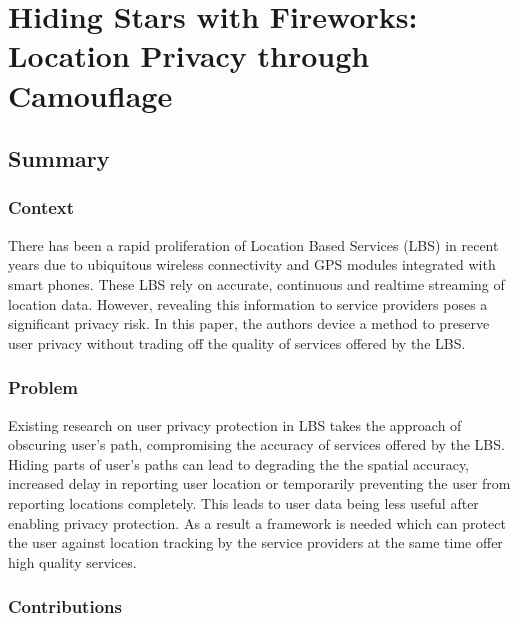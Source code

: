 \newpage
\section{Hiding Stars with Fireworks:
Location Privacy through Camouflage \cite{conf/europar/PetzoldBTU06}}\label{lect4}

\subsection{Summary} \label{lect4-sum}

\subsubsection{Context}

There has been a rapid proliferation of Location Based Services (LBS) in recent
years due to ubiquitous wireless connectivity and GPS modules integrated with 
smart phones. These LBS rely on accurate, continuous and realtime streaming of 
location data. However, revealing this information to service providers poses a 
significant privacy risk. In this paper, the authors device a method to preserve
user privacy without trading off the quality of services offered by the LBS. 

\subsubsection{Problem}

Existing research on user privacy protection in LBS takes the approach of 
obscuring user's path, compromising the accuracy of services offered by the 
LBS. Hiding parts of user's paths can lead to degrading the the spatial accuracy, 
increased delay in reporting user location or temporarily preventing the user from
reporting locations completely. This leads to user data being less useful after
enabling privacy protection. As a result a framework is needed which can protect
the user against location tracking by the service providers at the same time
offer high quality services. 
  
\subsubsection{Contributions}

